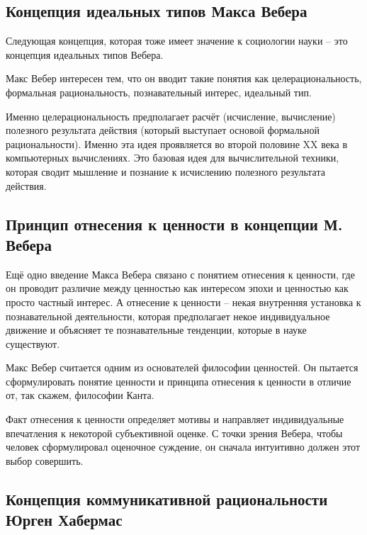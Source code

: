 \documentclass[main.tex]{subfiles}
\begin{document}
\subsection{Концепция идеальных типов Макса Вебера}


Следующая концепция, которая тоже имеет значение к социологии науки -- это концепция идеальных типов Вебера.

Макс Вебер интересен тем, что он вводит такие понятия как целерациональность, формальная рациональность, познавательный интерес, идеальный тип.

Именно целерациональность предполагает расчёт (исчисление, вычисление) полезного результата действия (который выступает основой формальной рациональности).
Именно эта идея проявляется во второй половине XX века в компьютерных вычислениях.
Это базовая идея для вычислительной техники, которая сводит мышление и познание к исчислению полезного результата действия. 

\subsection{Принцип отнесения к ценности в концепции М. Вебера}


Ещё одно введение Макса Вебера связано с понятием отнесения к ценности, где он проводит различие между ценностью как интересом эпохи и ценностью как просто частный интерес.
А отнесение к ценности -- некая внутренняя установка к познавательной деятельности, которая предполагает некое индивидуальное движение и объясняет те познавательные тенденции, которые в науке существуют.

Макс Вебер считается одним из основателей философии ценностей.
Он пытается сформулировать понятие ценности и принципа отнесения к ценности в отличие от, так скажем, философии Канта.

Факт отнесения к ценности определяет мотивы и направляет индивидуальные впечатления к некоторой субъективной оценке.
С точки зрения Вебера, чтобы человек сформулировал оценочное суждение, он сначала интуитивно должен этот выбор совершить.

\subsection{Концепция коммуникативной рациональности Юрген Хабермас}

\end{document}
